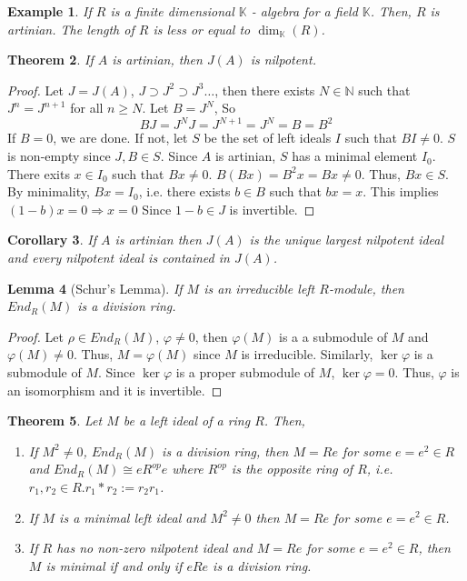 \documentclass[letterpaper, leqno, 12pt]{article}
\newcommand{\fin}{\qquad \quad \hfill \framebox[1.75mm][l]{\,}}
\newcommand{\bN}{\mathbb{N}}
\newcommand{\bK}{\mathbb{K}}
\theoremstyle{stdthm}
\newtheorem{thm}{Theorem}
\newtheorem{lem}[thm]{Lemma}
\newtheorem{cor}[thm]{Corollary}
\theoremstyle{stddef}
\newtheorem{eg}[thm]{Example} %
\theoremstyle{stdnonum}
\theoremstyle{stdqands}
\theoremstyle{stdbold}
\begin{document}
\begin{eg}
 If $R$ is a finite dimensional $\bK$ - algebra for a field $\bK$. Then, $R$ is artinian. The length of $R$ is less or equal to $\dim_\bK(R)$. 
\end{eg}

\begin{thm}
If $A$ is artinian, then $J(A)$ is nilpotent. 
\end{thm}

\begin{proof}
Let $J = J(A)$, $J \supset J^2 \supset J^3 \dots$, then there exists $N \in \bN$ such that $J^n = J^{n+1}$ for all $ n\geq N$. Let $B = J^N$, So 
\[ BJ = J^N J = J^{N+1} = J^N = B = B^2 \]
If $B = 0$, we are done. If not, let $S$ be the set of left ideals $I$ such that $BI \neq 0$. $S$ is non-empty since $J,B \in S$. Since $A$ is artinian, $S$ has a minimal element $I_0$. There exits $x \in I_0$ such that $Bx \neq 0$. $B(Bx) = B^2x = Bx \neq 0$. Thus, $Bx \in S$. By minimality, $Bx = I_0$, i.e. there exists $b \in B$ such that $bx = x$. This implies $(1-b)x = 0 \Rightarrow x = 0$ Since $1-b \in J$ is invertible. 
\end{proof}


\begin{cor}
If $A$ is artinian then $J(A)$ is the unique largest nilpotent ideal and every nilpotent ideal is contained in $J(A)$. 
\end{cor}

\begin{lem}[Schur's Lemma]
If $M$ is an irreducible left $R$-module, then $End_R(M)$ is a division ring. 
\end{lem}  

\begin{proof}
Let $\rho \in End_R(M)$, $\varphi \neq 0$, then $\varphi(M)$ is a a submodule of $M$ and $\varphi(M) \neq 0$. Thus, $M = \varphi(M)$ since $M$ is irreducible. Similarly, $\ker \varphi$ is a submodule of $M$. Since $\ker \varphi$ is a proper submodule of $M$, $\ker \varphi = 0$. Thus, $\varphi$ is an isomorphism and it is invertible. 
\end{proof}

\begin{thm}
Let $M$ be a left ideal of a ring $R$. Then,
\begin{enumerate}
\item If $M^2 \neq 0$, $End_R(M)$ is a division ring, then $M = Re$ for some $e = e^2 \in R$ and $End_R(M) \cong eR^{op}e$ where $R^{op}$ is the opposite ring of $R$, i.e. $r_1,r_2 \in R. r_1*r_2 := r_2r_1$. 
\item If $M$ is a minimal left ideal and $M^2 \neq 0$ then $M = Re$ for some $e = e^2 \in R$.
\item If $R$ has no non-zero nilpotent ideal and $M = Re$ for some $e = e^2 \in R$, then $M$ is minimal if and only if $eRe$ is a division ring.  
\end{enumerate}
\end{thm}
\end{document}
